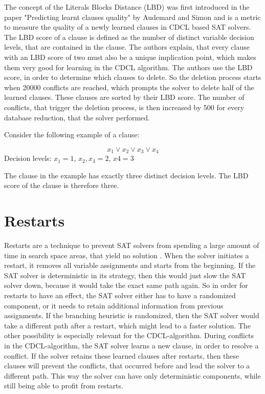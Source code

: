 The concept of the Literals Blocks Distance (LBD) was first introduced in the paper "Predicting learnt clauses quality" \cite{audemard2009predicting} by Audemard and Simon and is a metric to measure the quality of a newly learned clauses in CDCL based SAT solvers. The LBD score of a clause is defined as the number of distinct variable decision levels, that are contained in the clause. The authors explain, that every clause with an LBD score of two must also be a unique implication point, which makes them very good for learning in the CDCL algorithm. The authors use the LBD score, in order to determine which clauses to delete. So the deletion process starts when 20000 conflicts are reached, which prompts the solver to delete half of the learned clauses. These clauses are sorted by their LBD score. The number of conflicts, that trigger the deletion process, is then increased by 500 for every database reduction, that the solver performed.

Consider the following example of a clause:

\begin{leftbar}
\begin{center}
\begin{displaymath}
x_1 \vee x_2 \vee x_3 \vee x_4
\end{displaymath}
Decision levels: $x_1=1$, $x_2,x_3=2$, $x4=3$ 
\end{center}
\end{leftbar}

The clause in the example has exactly three distinct decision levels. The LBD score of the clause is therefore three.

\section{Restarts}

Restarts are a technique to prevent SAT solvers from spending a large amount of time in search space areas, that yield no solution \cite{biere2009handbook}. When the solver initiates a restart, it removes all variable assignments and starts from the beginning. If the SAT solver is deterministic in its strategy, then this would just slow the SAT solver down, because it would take the exact same path again. So in order for restarts to have an effect, the SAT solver either has to have a randomized component, or it needs to retain additional information from previous assignments. If the branching heuristic is randomized, then the SAT solver would take a different path after a restart, which might lead to a faster solution. The other possibility is especially relevant for the CDCL-algorithm. During conflicts in the CDCL-algorithm, the SAT solver learns a new clause, in order to resolve a conflict. If the solver retains these learned clauses after restarts, then these clauses will prevent the conflicts, that occurred before and lead the solver to a different path. This way the solver can have only deterministic components, while still being able to profit from restarts. \cite{biere2009handbook}

